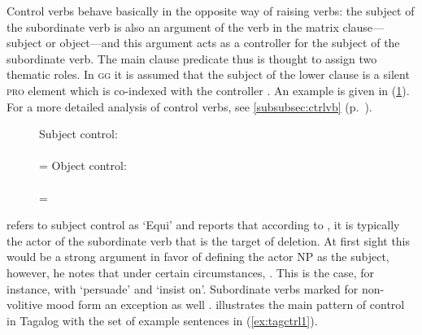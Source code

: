 Control verbs behave basically in the opposite way of raising verbs: the
subject of the subordinate verb is also an argument of the verb in the matrix
clause---subject or object---and this argument acts as a controller for the
subject of the subordinate verb. The main clause predicate thus is thought to
assign two thematic roles. In \textsc{gg} it is assumed that the subject of the
lower clause is a silent \textsc{pro} element which is co-indexed with the
controller \citep[442--445, 451]{carnie2013}. An example is given in
(\ref{ex:engctrl1}). For a more detailed analysis of control verbs, see
\autoref{subsubsec:ctrlvb} (p.~\pageref{subsubsec:ctrlvb}).

\begin{figure}[h]
\pex\label{ex:engctrl1}
\a Subject control:\medskip \\
	\\
	= 
\a Object control:\medskip \\
	\\
	= 
\xe
\end{figure}

\citet{kroeger1991} refers to subject control as `Equi' and reports that
according to \citet[505]{schachter1976}, it is typically the actor of the
subordinate verb that is the target of deletion. At first sight this would be a
strong argument in favor of defining the actor NP as the subject, however, he
notes that under certain circumstances, . This is the case, for instance, with  `persuade' and
 `insist on'. Subordinate verbs marked for non-volitive
mood form an exception as well \parencites[36--37]{kroeger1991}[96--97]
{kroeger1991}. \citet{kroeger1991} illustrates the main pattern of control in
Tagalog with the set of example sentences in (\ref{ex:tagctrl1}).

